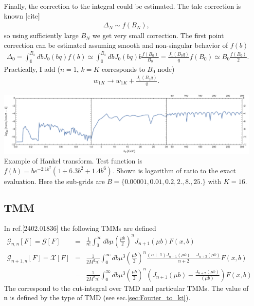 \documentclass[prd,nofootinbib,eqsecnum,final]{revtex4}
\newcommand{\nn}{\nonumber}
\renewcommand{\(}{\left(}
\renewcommand{\)}{\right)}
\renewcommand{\[}{\left[}
\renewcommand{\]}{\right]}
\begin{document}
Finally, the correction to the integral could be estimated. The tale correction is known [cite]
\begin{eqnarray}
\Delta_N\sim f(B_N),
\end{eqnarray}
so using sufficiently large $B_N$ we get very small correction. The first point correction can be estimated assuming smooth and non-singular behavior of $f(b)$
\begin{eqnarray}
\Delta_0=\int_0^{B_0} db J_0(b q)f(b)\simeq\int_0^{B_0} db J_0(b q) b \frac{f(B_0)}{B_0} = \frac{J_1(B_0 q)}{q}f(B_0)\simeq B_0\frac{f(B_0)}{2}.
\end{eqnarray}
Practically, I add ($n=1$, $k=K$ corresponds to $B_0$ node)
\begin{eqnarray}
w_{1K}\to  w_{1K}+\frac{J_1(B_0 q)}{q}.
\end{eqnarray}

\begin{center}
\includegraphics[width=\textwidth]{Figures/ktGrid-Gauss-16}
\\
Example of Hankel transform. Test function is $f(b)=b e^{-2.1 b^2}(1+6.3 b^2+1.4 b^6)$. Shown is logarithm of ratio to the exact evaluation. Here the sub-grids are $B=\{0.00001,0.01,0.2,2., 8., 25.\}$ with $K=16$.
\end{center}

\subsection{TMM}
\label{sec:TMM}

In ref.[2402.01836] the following TMMs are defined
\begin{eqnarray}
\mathcal{G}_{n,n}[F]=\mathcal{G}[F]&=&\frac{1}{n!}\int_0^\infty db \mu \(\frac{\mu b}{2}\)^n J_{n+1}(\mu b)F(x,b)
\\
\mathcal{G}_{n+1,n}[F]=\mathcal{X}[F]&=&\frac{1}{2M^2n!}\int_0^\infty db \mu^3 \(\frac{\mu b}{2}\)^n \frac{(n+1)J_{n+1}(\mu b)-J_{n+3}(\mu b)}{n+2}F(x,b)
\\\nn
&=&
\frac{1}{2M^2n!}\int_0^\infty db \mu^3 \(\frac{\mu b}{2}\)^n \(J_{n+1}(\mu b)-\frac{J_{n+2}(\mu b)}{(\mu b)}\)F(x,b)
\end{eqnarray}
The correspond to the cut-integral over TMD and particular TMMs. The value of n is defined by the type of TMD (see sec.\ref{sec:Fourier_to_kt}).
\end{document}
